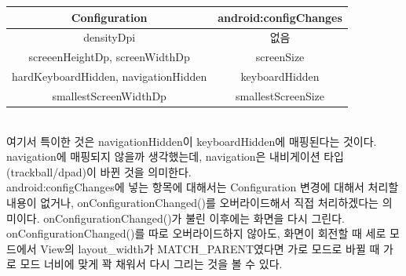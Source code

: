 \begin{tabular}{|c|c|}\hline
Configuration & android:configChanges \\ \hline
densityDpi & 없음 \\ \hline
screeenHeightDp, screenWidthDp & screenSize \\ \hline
hardKeyboardHidden, navigationHidden  & keyboardHidden  \\ \hline
smallestScreenWidthDp & smallestScreenSize \\ \hline
\end{tabular}\\

여기서 특이한 것은 navigationHidden이 keyboardHidden에 매핑된다는 것이다. 
navigation에 매핑되지 않을까 생각했는데, navigation은 내비게이션 타입(trackball/dpad)이 바뀐 것을 의미한다.\\

android:configChanges에 넣는 항목에 대해서는 Configuration 변경에 대해서 처리할 내용이 없거나, onConfigurationChanged()를 오버라이드해서 직접 처리하겠다는 의미이다. onConfigurationChanged()가 불린 이후에는 화면을 다시 그린다. 
onConfigurationChanged()를 따로 오버라이드하지 않아도, 화면이 회전할 때 세로 모드에서 View의 layout\_width가 MATCH\_PARENT였다면 가로 모드로 바뀔 때 가로 모드 너비에 맞게 꽉 채워서 다시 그리는 것을 볼 수 있다.\\

